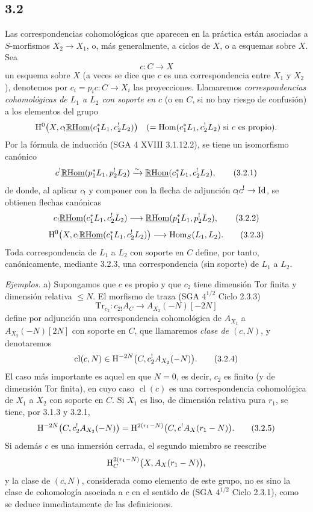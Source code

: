 \subsection*{3.2}
Las correspondencias cohomológicas que aparecen en la práctica están asociadas a $S$-morfismos $X_2\to X_1$, o, más generalmente, a ciclos de $X$, o a esquemas sobre $X$. Sea
\[
c:C\longrightarrow X
\]
un esquema sobre $X$ (a veces se dice que $c$ es una correspondencia entre $X_1$ y $X_2$), denotemos por $c_i=p_ic:C\to X_i$ las proyecciones. Llamaremos \emph{correspondencias cohomológicas de $L_1$ a $L_2$ con soporte en $c$} (o en $C$, si no hay riesgo de confusión) a los elementos del grupo
\[
\mathrm{H}^0\bigl(X,c_!\underline{\mathbb{R}\mathrm{Hom}}(c_1^*L_1,c_2^!L_2)\bigr)
\quad(=\operatorname{Hom}(c_1^*L_1,c_2^!L_2)\text{ si }c\text{ es propio}).
\]
Por la fórmula de inducción (SGA 4 XVIII 3.1.12.2), se tiene un isomorfismo canónico
\begin{equation}
c^!\underline{\mathbb{R}\mathrm{Hom}}(p_1^*L_1,p_2^!L_2)
\xrightarrow{\sim}
\underline{\mathbb{R}\mathrm{Hom}}(c_1^*L_1,c_2^!L_2),
\tag{3.2.1}
\end{equation}
de donde, al aplicar $c_!$ y componer con la flecha de adjunción $c_!c^!\to \mathrm{Id}$, se obtienen flechas canónicas
\begin{equation}
c_!\underline{\mathbb{R}\mathrm{Hom}}(c_1^*L_1,c_2^!L_2)
\longrightarrow
\underline{\mathbb{R}\mathrm{Hom}}(p_1^*L_1,p_2^!L_2),
\tag{3.2.2}
\end{equation}
\begin{equation}
\mathrm{H}^0\bigl(X,c_!\underline{\mathbb{R}\mathrm{Hom}}(c_1^*L_1,c_2^!L_2)\bigr)
\longrightarrow
\operatorname{Hom}_S(L_1,L_2).
\tag{3.2.3}
\end{equation}
Toda correspondencia de $L_1$ a $L_2$ con soporte en $C$ define, por tanto, canónicamente, mediante 3.2.3, una correspondencia (sin soporte) de $L_1$ a $L_2$.

\emph{Ejemplos.} a) Supongamos que $c$ es propio y que $c_2$ tiene dimensión Tor finita y dimensión relativa $\leq N$. El morfismo de traza (SGA $4^{1/2}$ Ciclo 2.3.3)
\[
\mathrm{Tr}_{c_2}:c_{2!}A_C\longrightarrow A_{X_2}(-N)[-2N]
\]
define por adjunción una correspondencia cohomológica de $A_{X_1}$ a $A_{X_2}(-N)[2N]$ con soporte en $C$, que llamaremos \emph{clase de $(c,N)$}, y denotaremos
\begin{equation}
\operatorname{cl}(c,N)\in \mathrm{H}^{-2N}\bigl(C,c_2^!A_{X_2}(-N)\bigr).
\tag{3.2.4}
\end{equation}
El caso más importante es aquel en que $N=0$, es decir, $c_2$ es finito (y de dimensión Tor finita), en cuyo caso $\operatorname{cl}(c)$ es una correspondencia cohomológica de $X_1$ a $X_2$ con soporte en $C$. Si $X_1$ es liso, de dimensión relativa pura $r_1$, se tiene, por 3.1.3 y 3.2.1,
\begin{equation}
\mathrm{H}^{-2N}\bigl(C,c_2^!A_{X_2}(-N)\bigr)
=
\mathrm{H}^{2(r_1-N)}\bigl(C,c^!A_X(r_1-N)\bigr).
\tag{3.2.5}
\end{equation}
Si además $c$ es una inmersión cerrada, el segundo miembro se reescribe
\[
\mathrm{H}^{2(r_1-N)}_C\bigl(X,A_X(r_1-N)\bigr),
\]
y la clase de $(c,N)$, considerada como elemento de este grupo, no es sino la clase de cohomología asociada a $c$ en el sentido de (SGA $4^{1/2}$ Ciclo 2.3.1), como se deduce inmediatamente de las definiciones.

